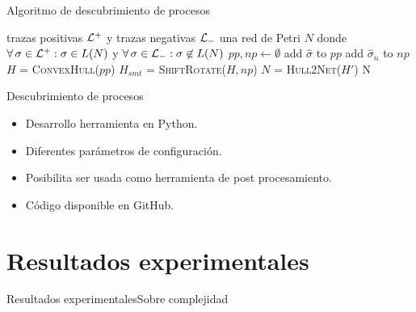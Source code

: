 \documentclass[spanish,pdf]{beamer}
\begin{document}
\begin{frame}[fragile]{Algoritmo de descubrimiento de procesos}{}
  \vspace*{-0.4cm}
    
  \begin{algorithm}[H]
  \scriptsize
    \caption*{Algoritmo completo de descubrimiento y simplificación supervisado}
    \begin{algorithmic}[1]
        \Require trazas positivas ${\mathcal L}^+$ y trazas negativas ${\mathcal L}_-$
        \Ensure una red de Petri $N$ donde $\forall \sigma \in \pmlog^+: \sigma \in L(N)$ y $\forall \sigma \in \pmlog_-: \sigma \not \in L(N)$
        \vspace{0.7pt}
        \State $pp, np \leftarrow \emptyset$ \label{algo:line1}
            \State add $\widehat\sigma$ to $pp$
         \EndFor
       \EndFor
          \State add $\widehat\sigma_n$ to $np$
        \EndFor \label{algo:line2}
        \State $H$ = \textsc{ConvexHull}($pp$) \label{algo:lineqhull}
        \State $H_{smt}$ = \textsc{ShiftRotate}($H, np$)
        \State $N$ = \textsc{Hull2Net}($H'$)
        \State \Return N
        \EndProcedure
    \end{algorithmic}
    \label{algo}
  \end{algorithm}
\end{frame}

\begin{frame}[fragile]{Descubrimiento de procesos}{\pachtool}
  \begin{itemize}
    \setlength\itemsep{0.2cm}
    \item Desarrollo herramienta \pachtool en Python.
    \item Diferentes parámetros de configuración.
    \item Posibilita ser usada como herramienta de post procesamiento.
    \item Código disponible en GitHub.
  \end{itemize}
\end{frame}

\section{Resultados experimentales}

\begin{frame}[fragile]{Resultados experimentales}{Sobre complejidad}
  \scriptsize
  
\end{frame}
\end{document}

